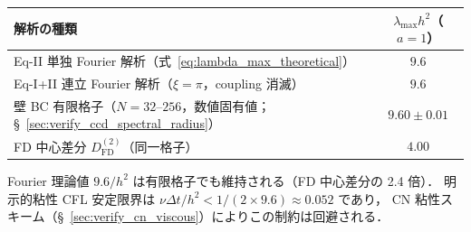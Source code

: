 \begin{tcolorbox}[mybox, title={CCD $D^{(2)}$ スペクトル半径のまとめ}]
\begin{center}
\PaperTableSetup
\begin{tabular}{lc}
\hline
解析の種類 & $\lambda_{\max} h^2$（$a=1$）\\
\hline
Eq-II 単独 Fourier 解析（式~\eqref{eq:lambda_max_theoretical}） & $9.6$ \\
Eq-I+II 連立 Fourier 解析（$\xi=\pi$，coupling 消滅） & $9.6$ \\
壁 BC 有限格子（$N = 32$--$256$，数値固有値；§~\ref{sec:verify_ccd_spectral_radius}） & $9.60 \pm 0.01$ \\
FD 中心差分 $D^{(2)}_{\mathrm{FD}}$（同一格子） & $4.00$ \\
\hline
\end{tabular}
\end{center}
Fourier 理論値 $9.6/h^2$ は有限格子でも維持される（FD 中心差分の 2.4 倍）．
明示的粘性 CFL 安定限界は $\nu\Delta t/h^2 < 1/(2 \times 9.6) \approx 0.052$ であり，
CN 粘性スキーム（§~\ref{sec:verify_cn_viscous}）によりこの制約は回避される．
\end{tcolorbox}

